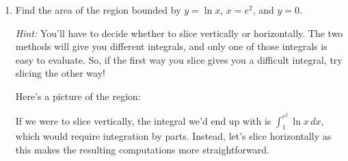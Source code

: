 \documentclass{article}
\begin{document}
\begin{enumerate}
\item 

\begin{problem}[\nstretch{1.5}]
    Find the area of the region bounded by $y = \ln x$, $x =
    e^2$, and $y = 0$.

    \emph{Hint:} You'll have to decide whether to slice vertically or
    horizontally.  The two methods will give you different integrals, and
    only one of those integrals is easy to evaluate.  So, if the first way
    you slice gives you a difficult integral, try slicing the other way!
  \end{problem}

  \begin{solution}
    Here's a picture of the region: 
    \begin{center}
    \end{center}
    If we were to slice vertically, the integral we'd end up with is
    $\displaystyle \int_1^{e^2} \ln x\,dx$, which would require integration by parts.  Instead, let's
    slice horizontally as this makes the resulting computations more straightforward.


\end{solution}
\end{enumerate}
\end{document}
